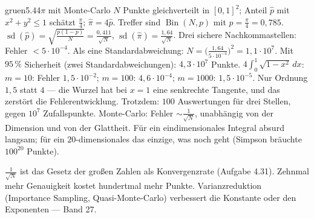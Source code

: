 \begin{loesungkarte}{gruen}{5.44}{$\pi$ mit Monte-Carlo}
$N$ Punkte gleichverteilt in $[0, 1]^{2}$; Anteil $\hat p$ mit $x^{2} + y^{2}\le1$ schätzt $\frac\pi4$; $\hat\pi = 4\hat p$.
Treffer sind $\operatorname{Bin}(N, p)$ mit $p = \frac\pi4 = 0{,}785$. $\operatorname{sd}(\hat p) = \sqrt{\frac{p(1 - p)}N} = \frac{0{,}411}{\sqrt N}$, $\operatorname{sd}(\hat\pi) = \frac{1{,}64}{\sqrt N}$. Drei sichere Nachkommastellen: Fehler $< 5\cdot10^{-4}$. Als eine Standardabweichung: $N = \bigl(\frac{1{,}64}{5\cdot10^{-4}}\bigr)^{2} = 1{,}1\cdot10^{7}$. Mit $95\,\%$ Sicherheit (zwei Standardabweichungen): $4{,}3\cdot10^{7}$ Punkte.
$4\int_0^1\sqrt{1 - x^{2}}\,dx$: $m = 10$: Fehler $1{,}5\cdot10^{-2}$; $m = 100$: $4{,}6\cdot10^{-4}$; $m = 1000$: $1{,}5\cdot10^{-5}$. Nur Ordnung $1{,}5$ statt $4$ --- die Wurzel hat bei $x = 1$ eine senkrechte Tangente, und das zerstört die Fehlerentwicklung. Trotzdem: $100$ Auswertungen für drei Stellen, gegen $10^{7}$ Zufallspunkte.
Monte-Carlo: Fehler $\sim\frac1{\sqrt N}$, unabhängig von der Dimension und von der Glattheit. Für ein eindimensionales Integral absurd langsam; für ein $20$-dimensionales das einzige, was noch geht (Simpson bräuchte $100^{20}$ Punkte).
\begin{mitnehmen}\kastentext
$\frac1{\sqrt N}$ ist das Gesetz der großen Zahlen als Konvergenzrate (Aufgabe 4.31). Zehnmal mehr Genauigkeit kostet hundertmal mehr Punkte. Varianzreduktion (Importance Sampling, Quasi-Monte-Carlo) verbessert die Konstante oder den Exponenten --- Band 27.
\end{mitnehmen}
\end{loesungkarte}
